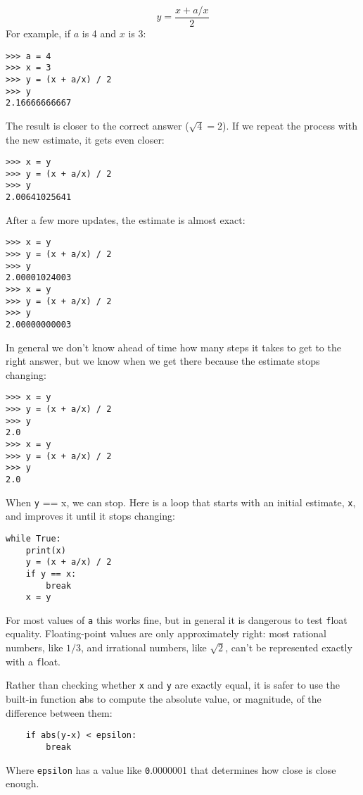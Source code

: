 \documentclass[
DIV=11,
fontsize=13,
twoside,
headinclude=false,
titlepage=firstiscover,
abstract=true,
headsepline=true,
footsepline=true,
chapterprefix=true, %
headings=big,
bibliography=totoc,%
captions=tableheading
]{scrbook}
\theoremstyle{definition}
\begin{document}
\[ y = \frac{x + a/x}{2} \]
%
For example, if $a$ is 4 and $x$ is 3:

\begin{lstlisting}
>>> a = 4
>>> x = 3
>>> y = (x + a/x) / 2
>>> y
2.16666666667
\end{lstlisting}
%
The result is closer to the correct answer ($\sqrt{4} = 2$).  If we
repeat the process with the new estimate, it gets even closer:

\begin{lstlisting}
>>> x = y
>>> y = (x + a/x) / 2
>>> y
2.00641025641
\end{lstlisting}
%
After a few more updates, the estimate is almost exact:

\begin{lstlisting}
>>> x = y
>>> y = (x + a/x) / 2
>>> y
2.00001024003
>>> x = y
>>> y = (x + a/x) / 2
>>> y
2.00000000003
\end{lstlisting}
%
In general we don't know ahead of time how many steps it takes
to get to the right answer, but we know when we get there
because the estimate
stops changing:

\begin{lstlisting}
>>> x = y
>>> y = (x + a/x) / 2
>>> y
2.0
>>> x = y
>>> y = (x + a/x) / 2
>>> y
2.0
\end{lstlisting}
%
When {\texttt y == x}, we can stop.  Here is a loop that starts
with an initial estimate, {\texttt x}, and improves it until it
stops changing:

\begin{lstlisting}
while True:
    print(x)
    y = (x + a/x) / 2
    if y == x:
        break
    x = y
\end{lstlisting}
%
For most values of {\texttt a} this works fine, but in general it is
dangerous to test {\texttt float} equality.
Floating-point values are only approximately right:
most rational numbers, like $1/3$, and irrational numbers, like
$\sqrt{2}$, can't be represented exactly with a {\texttt float}.

Rather than checking whether {\texttt x} and {\texttt y} are exactly equal, it
is safer to use the built-in function {\texttt abs} to compute the
absolute value, or magnitude, of the difference between them:

\begin{lstlisting}
    if abs(y-x) < epsilon:
        break
\end{lstlisting}
%
Where \verb"epsilon" has a value like {\texttt 0.0000001} that
determines how close is close enough.
\end{document}
